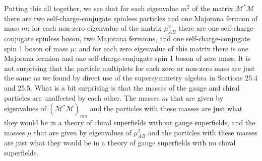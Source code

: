 Putting this all together, we see that for each eigenvalue \(m^2\) of the
matrix \(\mathcal{M}^*\mathcal{M}\) there are two self-charge-conjugate
spinless particles and one Majorana fermion of mass \(m\); for each non-zero
eigenvalue of the matrix \(\mu^2_{AB}\) there are one self-charge-conjugate
spinless boson, two Majorana fermions, and one self-charge-conjugate spin 1
boson of mass \(\mu\); and for each zero eigenvalue of this matrix there is
one Majorana fermion and one self-charge-conjugate spin 1 boson of zero mass.
It is not surprising that the particle multiplets for each zero or non-zero
mass are just the same as we found by direct use of the supersymmetry algebra
in Sections 25.4 and 25.5. What is a bit surprising is that the masses of the
gauge and chiral particles are unaffected by each other. The masses \(m\)
that are given by eigenvalues of \((\mathcal{M}^*\mathcal{M})_{nm}\) and the
particles with these masses are just what they would be in a theory of chiral
superfields without gauge superfields, and the masses \(\mu\) that are given
by eigenvalues of \(\mu^2_{AB}\) and the particles with these masses are just
what they would be in a theory of gauge superfields with no chiral
superfields.


